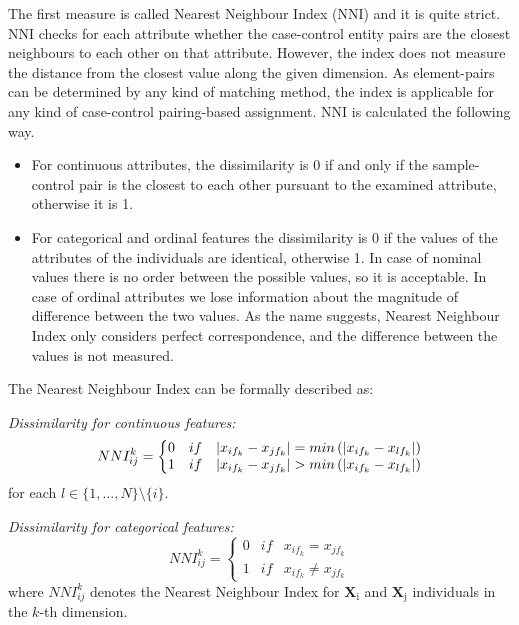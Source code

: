 \noindent The first measure is called Nearest Neighbour Index (NNI) and it is quite strict. NNI checks for each attribute whether the case-control entity pairs are the closest neighbours to each other on that attribute. However, the index does not measure the distance from the closest value along the given dimension. As element-pairs can be determined by any kind of matching method, the index is applicable for any kind of case-control pairing-based assignment. NNI is calculated the following way.
\begin{itemize}
	\item For continuous attributes, the dissimilarity is 0 if and only if the sample-control pair is the closest to each other pursuant to the examined attribute, otherwise it is 1.
	\item For categorical and ordinal features the dissimilarity is 0 if the values of the attributes of the individuals are identical, otherwise 1. In case of nominal values there is no order between the possible values, so it is acceptable. In case of ordinal attributes we lose information about the magnitude of difference between the two values. As the name suggests, Nearest Neighbour Index only considers perfect correspondence, and the difference between the values is not measured.
\end{itemize}

\noindent The Nearest Neighbour Index can be formally described as:

\vspace{0.3cm}
\noindent\emph{Dissimilarity for continuous features:}
\begin{equation}
	NNI_{ij}^{k}=\left\{\begin{matrix}
	0 & if &  \lvert x_{if_k}-x_{jf_k}\rvert=min\left(\lvert x_{if_k}-x_{lf_k}\rvert\right) \\
	1 & if &  \lvert x_{if_k}-x_{jf_k}\rvert>min\left(\lvert x_{if_k}-x_{lf_k}\rvert\right)
	\end{matrix}\right.\label{eq:nni_cont}
\end{equation}
for each $l \in \{1, \dots, N\} \setminus \{i\}$.

\vspace{0.3cm}
\noindent\emph{Dissimilarity for categorical features:}
\begin{equation}
	NNI_{ij}^{k}=\left\{\begin{matrix}
	0 & if  & x_{if_k}=x_{jf_k}\\ 
	1 & if  &  x_{if_k}\neq x_{jf_k}
	\end{matrix}\right.\label{eq:ddi_cat}
\end{equation}
where $NNI_{ij}^{k}$ denotes the Nearest Neighbour Index for $\bm{\mathrm{\textbf{X}_i}}$ and $\bm{\mathrm{\textbf{X}_j}}$ individuals in the $k$-th dimension. %

